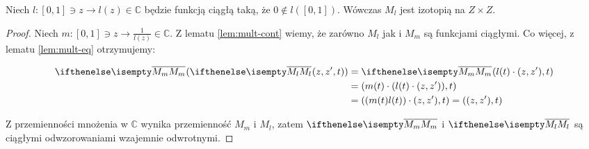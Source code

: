 \begin{lem} \label{lem:izotopy-generation}
  Niech $l: [0,1] \ni z \rightarrow l(z) \in \mathbb{C}$ będzie funkcją ciągłą taką, że $0 \not\in l([0,1])$. Wówczas $M_l$ jest izotopią na $Z \times Z$.
  
  \begin{proof}
    Niech $m: [0,1] \ni z \rightarrow \frac{1}{l(z)} \in \mathbb{C}$. Z lematu \ref{lem:mult-cont} wiemy, że zarówno $M_l$ jak i $M_m$ są funkcjami ciągłymi. Co więcej, z lematu \ref{lem:mult-eq} otrzymujemy:
    
    \begin{align*}
      \cl{M_m}(\cl{M_l}(z, z', t)) &= \cl{M_m}(l(t) \cdot (z, z'), t) \\
      &= (m(t) \cdot (l(t) \cdot (z,z')), t) \\
      &= ((m(t) l(t)) \cdot (z,z'), t) = ((z,z'), t)
    \end{align*}
    
    Z przemienności mnożenia w $\mathbb{C}$ wynika przemienność $M_m$ i $M_l$, zatem $\cl{M_m}$ i $\cl{M_l}$ są ciągłymi odwzorowaniami wzajemnie odwrotnymi.
  \end{proof}
\end{lem}


